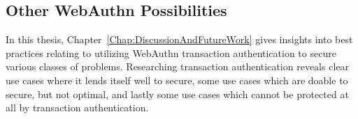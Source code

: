 
\subsection{Other WebAuthn Possibilities}

In this thesis, Chapter~\ref{Chap:DiscussionAndFutureWork} gives insights into best practices relating to utilizing WebAuthn transaction authentication to secure various classes of problems. Researching transaction authentication reveals clear use cases where it lends itself well to secure, some use cases which are doable to secure, but not optimal, and lastly some use cases which cannot be protected at all by transaction authentication. 




